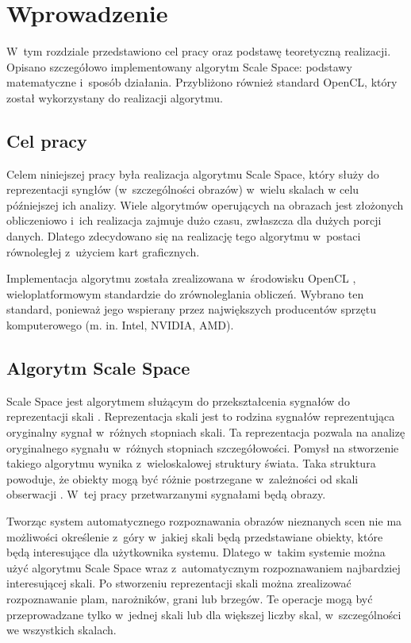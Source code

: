 \chapter{Wprowadzenie}
\label{cha:wprowadzenie}

W~tym rozdziale przedstawiono cel pracy oraz podstawę teoretyczną realizacji. Opisano szczegółowo implementowany algorytm Scale Space: podstawy matematyczne i~sposób działania. Przybliżono również standard OpenCL, który został wykorzystany do realizacji algorytmu.


\section{Cel pracy}
\label{sec:cel}
Celem niniejszej pracy była realizacja algorytmu Scale Space, który służy do reprezentacji syngłów (w~szczególności obrazów) w~wielu skalach w celu późniejszej ich analizy.
Wiele algorytmów operujących na obrazach jest złożonych obliczeniowo i~ich realizacja zajmuje dużo czasu, zwłaszcza dla dużych porcji danych. Dlatego zdecydowano się na realizację tego algorytmu w~postaci równoległej z~użyciem kart graficznych.

Implementacja algorytmu została zrealizowana w~środowisku OpenCL \cite{OpenCL}, wieloplatformowym standardzie do zrównoleglania obliczeń. Wybrano ten standard, ponieważ jego wspierany przez największych producentów sprzętu komputerowego (m. in. Intel\textsuperscript{\textregistered}, NVIDIA\textsuperscript{\texttrademark}, AMD).

\section{Algorytm Scale Space}
\label{sec:algorytm}
Scale Space jest algorytmem służącym do przekształcenia sygnałów do reprezentacji skali \cite{SSFramework}. Reprezentacja skali jest to rodzina sygnałów reprezentująca oryginalny sygnał w~różnych stopniach skali.
Ta reprezentacja pozwala na analizę oryginalnego sygnału w~różnych stopniach szczegółowości.
Pomysł na stworzenie takiego algorytmu wynika z~wieloskalowej struktury świata. Taka struktura powoduje, że obiekty mogą być różnie postrzegane w~zależności od skali obserwacji \cite{Enc09}.
W~tej pracy przetwarzanymi sygnałami będą obrazy.

Tworząc system automatycznego rozpoznawania obrazów nieznanych scen nie ma możliwości określenie z~góry w~jakiej skali będą przedstawiane obiekty, które będą interesujące dla użytkownika systemu. Dlatego w~takim systemie można użyć algorytmu Scale Space wraz z~automatycznym rozpoznawaniem najbardziej interesującej skali. Po stworzeniu reprezentacji skali można zrealizować rozpoznawanie plam, narożników, grani lub brzegów. Te operacje mogą być przeprowadzane tylko w~jednej skali lub dla większej liczby skal, w~szczególności we wszystkich skalach.

